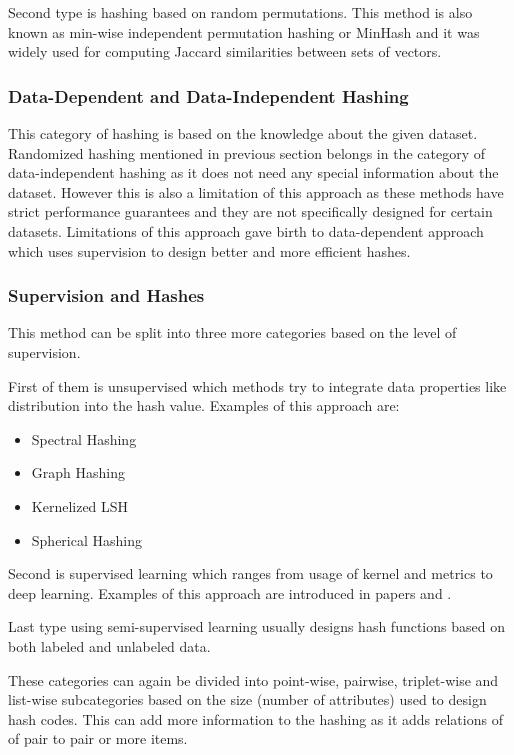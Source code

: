 Second type is hashing based on random permutations. This method is also known as min-wise independent permutation hashing or MinHash and it was widely used for computing Jaccard similarities between sets of vectors.

\subsubsection{Data-Dependent and Data-Independent Hashing}
This category of hashing is based on the knowledge about the given dataset. Randomized hashing mentioned in previous section belongs in the category of data-independent hashing as it does not need any special information about the dataset. However this is also a limitation of this approach as these methods have strict performance guarantees and they are not specifically designed for certain datasets. Limitations of this approach gave birth to data-dependent approach which uses supervision to design better and more efficient hashes. 

\subsubsection{Supervision and Hashes}
This method can be split into three more categories based on the level of supervision.

First of them is unsupervised which methods try to integrate data properties like distribution into the hash value. Examples of this approach are:
\begin{itemize}
\item Spectral Hashing
\item Graph Hashing
\item Kernelized LSH
\item Spherical Hashing
\end{itemize}

Second is supervised learning which ranges from usage of kernel and metrics to deep learning. Examples of this approach are introduced in papers \cite{LM1} and 
\cite{LM2}.

Last type using semi-supervised learning usually designs hash functions based on both labeled and unlabeled data.

These categories can again be divided into point-wise, pairwise, triplet-wise and list-wise subcategories based on the size (number of attributes) used to design hash codes. This can add more information to the hashing as it adds relations of of pair to pair or more items.

